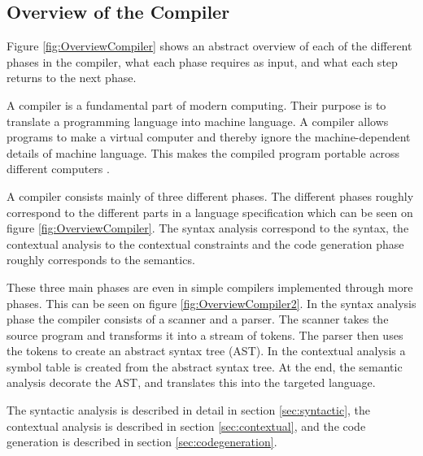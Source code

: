 \subsection{Overview of the Compiler}
\label{sec:OverviewCompiler}
Figure \ref{fig:OverviewCompiler} shows an abstract overview of each of the different phases in the compiler, what each phase requires as input, and what each step returns to the next phase.

A compiler is a fundamental part of modern computing. Their purpose is to translate a programming language into machine language. A compiler allows programs to make a virtual computer and thereby ignore the machine-dependent details of machine language. This makes the compiled program portable across different computers \citep{CraftingACompiler}.

A compiler consists mainly of three different phases. The different phases roughly correspond to the different parts in a language specification which can be seen on figure \ref{fig:OverviewCompiler}. The syntax analysis correspond to the syntax, the contextual analysis to the contextual constraints and the code generation phase roughly corresponds to the semantics.

These three main phases are even in simple compilers implemented through more phases. This can be seen on figure \ref{fig:OverviewCompiler2}. In the syntax analysis phase the compiler consists of a scanner and a parser. The scanner takes the source program and transforms it into a stream of tokens. The parser then uses the tokens to create an abstract syntax tree (AST). In the contextual analysis a symbol table is created from the abstract syntax tree. At the end, the semantic analysis decorate the AST, and translates this into the targeted language.

The syntactic analysis is described in detail in section \ref{sec:syntactic}, the contextual analysis is described in section \ref{sec:contextual}, and the code generation is described in section \ref{sec:codegeneration}.

